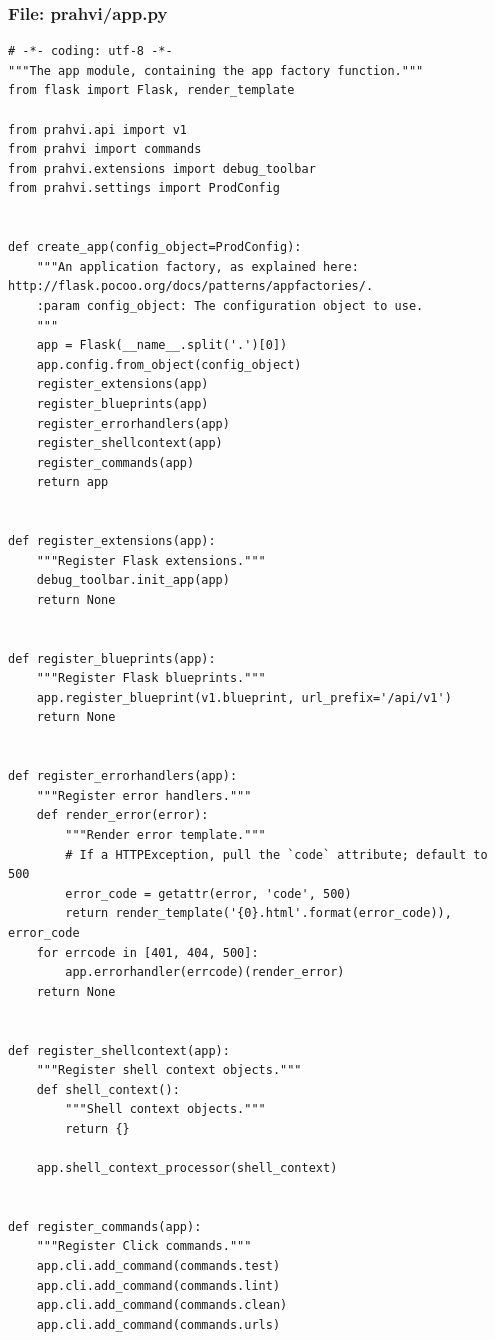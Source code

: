 \subsubsection{File: prahvi/app.py}
\begin{lstlisting}
# -*- coding: utf-8 -*-
"""The app module, containing the app factory function."""
from flask import Flask, render_template

from prahvi.api import v1
from prahvi import commands
from prahvi.extensions import debug_toolbar 
from prahvi.settings import ProdConfig


def create_app(config_object=ProdConfig):
    """An application factory, as explained here: http://flask.pocoo.org/docs/patterns/appfactories/.
    :param config_object: The configuration object to use.
    """
    app = Flask(__name__.split('.')[0])
    app.config.from_object(config_object)
    register_extensions(app)
    register_blueprints(app)
    register_errorhandlers(app)
    register_shellcontext(app)
    register_commands(app)
    return app


def register_extensions(app):
    """Register Flask extensions."""
    debug_toolbar.init_app(app)
    return None


def register_blueprints(app):
    """Register Flask blueprints."""
    app.register_blueprint(v1.blueprint, url_prefix='/api/v1')
    return None


def register_errorhandlers(app):
    """Register error handlers."""
    def render_error(error):
        """Render error template."""
        # If a HTTPException, pull the `code` attribute; default to 500
        error_code = getattr(error, 'code', 500)
        return render_template('{0}.html'.format(error_code)), error_code
    for errcode in [401, 404, 500]:
        app.errorhandler(errcode)(render_error)
    return None


def register_shellcontext(app):
    """Register shell context objects."""
    def shell_context():
        """Shell context objects."""
        return {}

    app.shell_context_processor(shell_context)


def register_commands(app):
    """Register Click commands."""
    app.cli.add_command(commands.test)
    app.cli.add_command(commands.lint)
    app.cli.add_command(commands.clean)
    app.cli.add_command(commands.urls)
\end{lstlisting}

